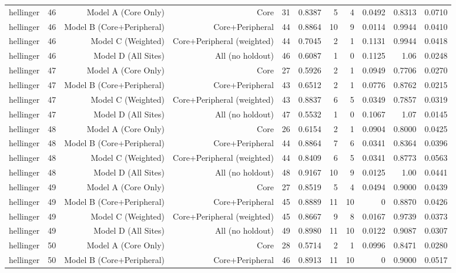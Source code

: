 {\begin{longtable}{lrrrrrrrrrr}
  hellinger & 46 & Model A (Core Only) & Core & 31 & 0.8387 & 5 & 4 & 0.0492 & 0.8313 & 0.0710 \\
  hellinger & 46 & Model B (Core+Peripheral) & Core+Peripheral & 44 & 0.8864 & 10 & 9 & 0.0114 & 0.9944 & 0.0410 \\
  hellinger & 46 & Model C (Weighted) & Core+Peripheral (weighted) & 44 & 0.7045 & 2 & 1 & 0.1131 & 0.9944 & 0.0418 \\
  hellinger & 46 & Model D (All Sites) & All (no holdout) & 46 & 0.6087 & 1 & 0 & 0.1125 & 1.06 & 0.0248 \\
  hellinger & 47 & Model A (Core Only) & Core & 27 & 0.5926 & 2 & 1 & 0.0949 & 0.7706 & 0.0270 \\
  hellinger & 47 & Model B (Core+Peripheral) & Core+Peripheral & 43 & 0.6512 & 2 & 1 & 0.0776 & 0.8762 & 0.0215 \\
  hellinger & 47 & Model C (Weighted) & Core+Peripheral (weighted) & 43 & 0.8837 & 6 & 5 & 0.0349 & 0.7857 & 0.0319 \\
  hellinger & 47 & Model D (All Sites) & All (no holdout) & 47 & 0.5532 & 1 & 0 & 0.1067 & 1.07 & 0.0145 \\
  hellinger & 48 & Model A (Core Only) & Core & 26 & 0.6154 & 2 & 1 & 0.0904 & 0.8000 & 0.0425 \\
  hellinger & 48 & Model B (Core+Peripheral) & Core+Peripheral & 44 & 0.8864 & 7 & 6 & 0.0341 & 0.8364 & 0.0396 \\
  hellinger & 48 & Model C (Weighted) & Core+Peripheral (weighted) & 44 & 0.8409 & 6 & 5 & 0.0341 & 0.8773 & 0.0563 \\
  hellinger & 48 & Model D (All Sites) & All (no holdout) & 48 & 0.9167 & 10 & 9 & 0.0125 & 1.00 & 0.0441 \\
  hellinger & 49 & Model A (Core Only) & Core & 27 & 0.8519 & 5 & 4 & 0.0494 & 0.9000 & 0.0439 \\
  hellinger & 49 & Model B (Core+Peripheral) & Core+Peripheral & 45 & 0.8889 & 11 & 10 & 0 & 0.8870 & 0.0426 \\
  hellinger & 49 & Model C (Weighted) & Core+Peripheral (weighted) & 45 & 0.8667 & 9 & 8 & 0.0167 & 0.9739 & 0.0373 \\
  hellinger & 49 & Model D (All Sites) & All (no holdout) & 49 & 0.8980 & 11 & 10 & 0.0122 & 0.9087 & 0.0307 \\
  hellinger & 50 & Model A (Core Only) & Core & 28 & 0.5714 & 2 & 1 & 0.0996 & 0.8471 & 0.0280 \\
  hellinger & 50 & Model B (Core+Peripheral) & Core+Peripheral & 46 & 0.8913 & 11 & 10 & 0 & 0.9000 & 0.0517 \\

\end{longtable}}
